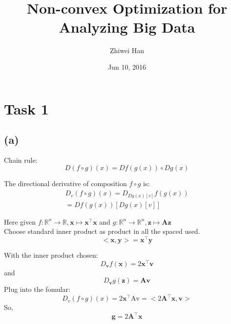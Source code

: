\documentclass[12pt,a4paper,titlepage]{article}
\begin{document}
\title{\textbf{Non-convex Optimization for Analyzing Big Data}\\
\medskip
{}}

\author{Zhiwei Han}
\date{Jun 10, 2016}
\maketitle


\setlength{\parindent}{0pt} \setlength{\parskip}{2ex plus 0.5ex
minus 0.2ex}


\section*{Task 1}
\subsection*{(a)}
Chain rule:\\
\begin{equation}
	D (f \circ g) (x) = D f(g(x)) \circ Dg(x)
\end{equation}

The directional derivative of composition \( f \circ g\) is:
\begin{equation}
\begin{split}
	D_{v}(f \circ g) (x) = D _{Dg(x)[v]} f(g(x)) \\=Df(g(x))[Dg(x)[v]]
\end{split}
\end{equation}

Here given $f:\mathbb{R}^{n} \to \mathbb{R}, \textbf{x} \mapsto \textbf{x}^\intercal \textbf{x}$ and $g:\mathbb{R}^{n} \to \mathbb{R}^{n}, \textbf{z} \mapsto \textbf{A} \textbf{z}$\\
Choose standard inner product as product in all the spaced used. 
\begin{displaymath}
	<\textbf{x}, \textbf{y}>=\textbf{x}^\intercal \textbf{y}
\end{displaymath}

With the inner product chosen:
\begin{equation}
	D_{\textbf{v}}f(\textbf{x})=2\textbf{x}^\intercal \textbf{v}
\end{equation}
and
\begin{equation}
	D_{\textbf{v}}g(\textbf{z})=\textbf{Av}
\end{equation}
Plug into the fomular:
\begin{equation}
	D_{v}(f \circ g) (x)=2\textbf{x}^\intercal \text{Av} = < 2\textbf{A}^\intercal \textbf{x},\textbf{v} >
\end{equation}
So, 
\begin{displaymath}
	\textbf{g}=2\textbf{A}^\intercal \textbf{x}
\end{displaymath}
\newpage
\end{document}
